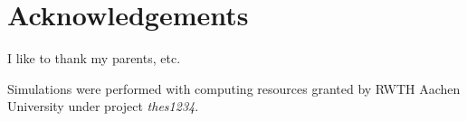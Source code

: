 \section{Acknowledgements}
\label{sec:acknowledgements}
%
I like to thank my parents, etc.
\par
Simulations were performed with computing resources granted by RWTH Aachen University under project \textit{thes1234}.
%


